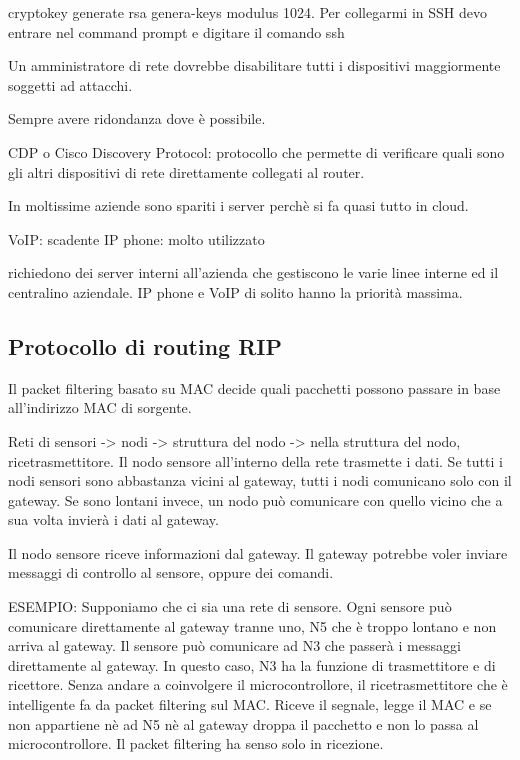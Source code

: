 \documentclass{article}
\begin{document}
    cryptokey generate rsa genera-keys modulus 1024.
    Per collegarmi in SSH devo entrare nel command prompt e digitare il comando ssh

    Un amministratore di rete dovrebbe disabilitare tutti i dispositivi maggiormente soggetti ad attacchi.

    Sempre avere ridondanza dove è possibile.

    CDP o Cisco Discovery Protocol: protocollo che permette di verificare quali sono gli altri dispositivi di rete direttamente collegati al router.

    In moltissime aziende sono spariti i server perchè si fa quasi tutto in cloud.
    
    VoIP: scadente
    IP phone: molto utilizzato

    richiedono dei server interni all'azienda che gestiscono le varie linee interne ed il centralino aziendale. IP phone e VoIP di solito hanno la priorità massima.

    \subsection{Protocollo di routing RIP}
    Il packet filtering basato su MAC decide quali pacchetti possono passare in base all'indirizzo MAC di sorgente.

    Reti di sensori -> nodi -> struttura del nodo -> nella struttura del nodo, ricetrasmettitore.
    Il nodo sensore all'interno della rete trasmette i dati. Se tutti i nodi sensori sono abbastanza vicini al gateway, tutti i nodi comunicano solo con il gateway. Se sono lontani invece, un nodo può comunicare con quello vicino che a sua volta invierà i dati al gateway.

    Il nodo sensore riceve informazioni dal gateway. Il gateway potrebbe voler inviare messaggi di controllo al sensore, oppure dei comandi.

    ESEMPIO:
    Supponiamo che ci sia una rete di sensore. Ogni sensore può comunicare direttamente al gateway tranne uno, N5 che è troppo lontano e non arriva al gateway. Il sensore può comunicare ad N3 che passerà i messaggi direttamente al gateway. In questo caso, N3 ha la funzione di trasmettitore e di ricettore. Senza andare a coinvolgere il microcontrollore, il ricetrasmettitore che è intelligente fa da packet filtering sul MAC. Riceve il segnale, legge il MAC e se non appartiene nè ad N5 nè al gateway droppa il pacchetto e non lo passa al microcontrollore. Il packet filtering ha senso solo in ricezione.
\end{document}
